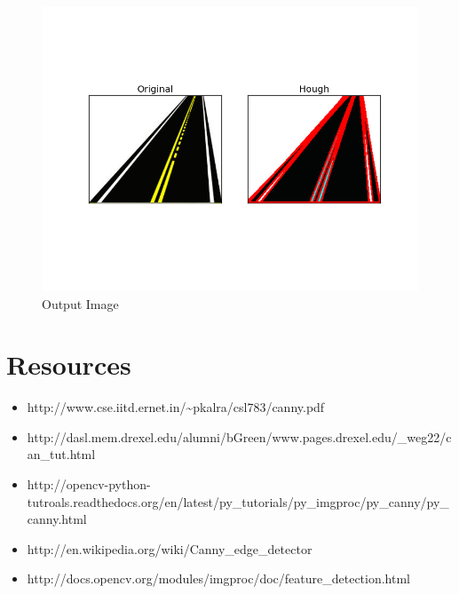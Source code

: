 \documentclass[]{article}
\providecommand{\tightlist}{%
  \setlength{\itemsep}{0pt}\setlength{\parskip}{0pt}}
\begin{document}
\begin{figure}[htbp]
\centering
\includegraphics{images/Line_Detection/Hough Lines/hough.png}
\caption{Output Image}
\end{figure}

\section{Resources}\label{resources}

\begin{itemize}
\tightlist
\item
  http://www.cse.iitd.ernet.in/\textasciitilde{}pkalra/csl783/canny.pdf
\item
  http://dasl.mem.drexel.edu/alumni/bGreen/www.pages.drexel.edu/\_weg22/can\_tut.html
\item
  http://opencv-python-tutroals.readthedocs.org/en/latest/py\_tutorials/py\_imgproc/py\_canny/py\_canny.html
\item
  http://en.wikipedia.org/wiki/Canny\_edge\_detector
\item
  http://docs.opencv.org/modules/imgproc/doc/feature\_detection.html
\end{itemize}
\end{document}
